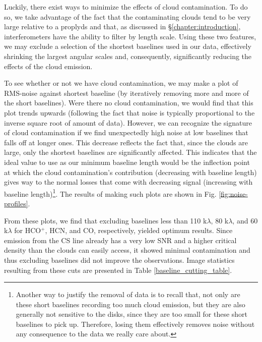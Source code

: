 Luckily, there exist ways to minimize the effects of cloud contamination. To do so, we take advantage of the fact that the contaminating clouds tend to be very large relative to a proplyds and that, as discussed in \S\ref{chapter:introduction}, interferometers have the ability to filter by length scale. Using these two features, we may exclude a selection of the shortest baselines used in our data, effectively shrinking the largest angular scales and, consequently, significantly reducing the effects of the cloud emission.


To see whether or not we have cloud contamination, we may make a plot of RMS-noise against shortest baseline (by iteratively removing more and more of the short baselines). Were there no cloud contamination, we would find that this plot trends upwards (following the fact that noise is typically proportional to the inverse square root of amount of data). However, we can recognize the signature of cloud contamination if we find unexpectedly high noise at low baselines that falls off at longer ones. This decrease reflects the fact that, since the clouds are large, only the shortest baselines are significantly affected. This indicates that the ideal value to use as our minimum baseline length would be the inflection point at which the cloud contamination's contribution (decreasing with baseline length) gives way to the normal losses that come with decreasing signal (increasing with baseline length)\footnote{Another way to justify the removal of data is to recall that, not only are these short baselines recording too much cloud emission, but they are also generally not sensitive to the disks, since they are too small for these short baselines to pick up. Therefore, losing them effectively removes noise without any consequence to the data we really care about.}. The results of making such plots are shown in Fig. \ref{fig:noise-profiles}.

From these plots, we find that excluding baselines less than 110 k$\lambda$, 80 k$\lambda$, and 60  k$\lambda$ for HCO$^{+}$, HCN, and CO, respectively, yielded optimum results. Since emission from the CS line already has a very low SNR and a higher critical density than the clouds can easily access, it showed minimal contamination and thus excluding baselines did not improve the observations. Image statistics resulting from these cuts are presented in Table \ref{baseline_cutting_table}.

